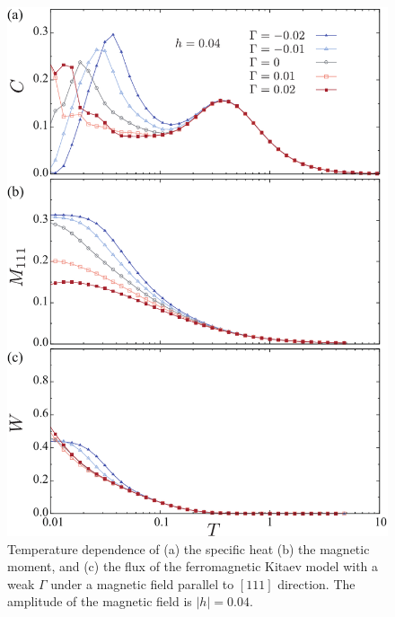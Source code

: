 \documentclass[reprint,amsmath,amssymb,aps,prx]{revtex4-2}
\begin{document}
\begin{figure}
  \begin{center}
    \includegraphics[width=0.9\linewidth]{Figs/plot_CMF_h0.04_G.pdf}
  \end{center}
  \caption{Temperature dependence of (a) the specific heat (b) the magnetic moment, and (c) the flux of the ferromagnetic Kitaev model with a weak $\Gamma$ under a magnetic field parallel to $[111]$ direction. The amplitude of the magnetic field is $|h|=0.04$.}
  \label{fig:CMF_h0.04_G}
\end{figure}
\end{document}
